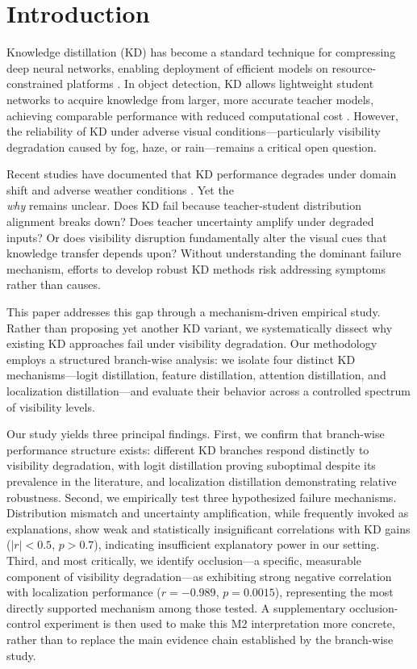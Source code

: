 \section{Introduction}
\label{sec:intro}

Knowledge distillation (KD) has become a standard technique for compressing deep neural networks, enabling deployment of efficient models on resource-constrained platforms \cite{hinton2015distilling}. In object detection, KD allows lightweight student networks to acquire knowledge from larger, more accurate teacher models, achieving comparable performance with reduced computational cost \cite{chen2017learning, dai2021general}. However, the reliability of KD under adverse visual conditions---particularly visibility degradation caused by fog, haze, or rain---remains a critical open question.

Recent studies have documented that KD performance degrades under domain shift and adverse weather conditions \cite{guo2021meets, du2022learning}. Yet the \\\emph{why} remains unclear. Does KD fail because teacher-student distribution alignment breaks down? Does teacher uncertainty amplify under degraded inputs? Or does visibility disruption fundamentally alter the visual cues that knowledge transfer depends upon? Without understanding the dominant failure mechanism, efforts to develop robust KD methods risk addressing symptoms rather than causes.

This paper addresses this gap through a mechanism-driven empirical study. Rather than proposing yet another KD variant, we systematically dissect why existing KD approaches fail under visibility degradation. Our methodology employs a structured branch-wise analysis: we isolate four distinct KD mechanisms---logit distillation, feature distillation, attention distillation, and localization distillation---and evaluate their behavior across a controlled spectrum of visibility levels.

Our study yields three principal findings. First, we confirm that branch-wise performance structure exists: different KD branches respond distinctly to visibility degradation, with logit distillation proving suboptimal despite its prevalence in the literature, and localization distillation demonstrating relative robustness. Second, we empirically test three hypothesized failure mechanisms. Distribution mismatch and uncertainty amplification, while frequently invoked as explanations, show weak and statistically insignificant correlations with KD gains ($|r| < 0.5$, $p > 0.7$), indicating insufficient explanatory power in our setting. Third, and most critically, we identify occlusion---a specific, measurable component of visibility degradation---as exhibiting strong negative correlation with localization performance ($r=-0.989$, $p=0.0015$), representing the most directly supported mechanism among those tested. A supplementary occlusion-control experiment is then used to make this M2 interpretation more concrete, rather than to replace the main evidence chain established by the branch-wise study.

